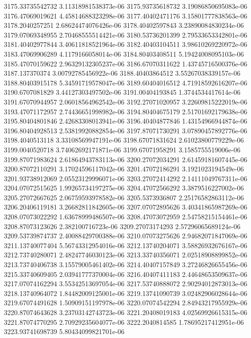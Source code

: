 {3175.33735542732 3.11318981538373e-06
3175.93735618732 3.19086850695083e-06
3176.47069019621 4.45814688323298e-06
3177.40402471176 3.15801777838563e-06
3178.2040257251 2.68624474076426e-06
3178.40402597843 3.23890084830234e-06
3179.07069348955 2.70468555514421e-06
3180.53736201399 2.79533653342801e-06
3181.40402977844 3.40611818521964e-06
3182.40403104511 3.98610269220972e-06
3183.47069906289 4.1179166058014e-06
3184.80403408511 5.19424008095103e-06
3185.47070159622 2.96329132305237e-06
3186.67070311622 1.43745716500376e-06
3187.137370374 3.00792785456922e-06
3188.40403864512 3.55267038339157e-06
3188.80403915178 5.34591719578047e-06
3189.60404016512 4.71918592616207e-06
3190.6707081829 3.44127303497502e-06
3191.00404193845 1.3744534417614e-06
3191.67070944957 2.06018564962542e-06
3192.27071020957 3.22609815222019e-06
3193.47071172957 2.74436651998982e-06
3194.80404675179 2.51701692179638e-06
3195.80404801846 2.42683308013941e-06
3196.40404877846 1.43154966944874e-06
3196.80404928513 2.53819920882854e-06
3197.87071730291 3.07890457892776e-06
3198.4040513118 3.33108569947191e-06
3198.67071831624 2.61023800779229e-06
3199.0040520718 3.74062692171871e-06
3199.67071958291 3.1585755519006e-06
3199.87071983624 2.61864943783113e-06
3200.27072034291 2.61459181607445e-06
3200.87072110291 3.17024596117042e-06
3201.47072186291 3.1921023194549e-06
3201.93738912069 2.05523129996071e-06
3203.27072414292 2.14111049767311e-06
3204.07072515625 1.99265734197275e-06
3204.47072566292 3.3879516227002e-06
3205.27072667625 2.06759593978582e-06
3205.5373936807 2.25176582863112e-06
3206.20406119181 3.26682811842605e-06
3207.07072895626 3.40341865987269e-06
3208.07073022292 1.63678999486507e-06
3208.47073072959 2.54758215154461e-06
3208.87073123626 2.382100716723e-06
3209.27073174293 2.57296065689124e-06
3209.53739874737 2.40088429700388e-06
3210.07073275626 2.94682071847069e-06
3211.13740077404 5.56743312954016e-06
3212.13740204071 3.58826932676167e-06
3212.73740280071 2.48247746030123e-06
3213.33740356071 2.02518908899852e-06
3213.73740406738 3.15579005461402e-06
3214.40407157849 3.27246826655456e-06
3215.33740609405 2.03941777370004e-06
3216.40407411183 2.44648653509637e-06
3217.07074162294 3.55342513697054e-06
3217.53740888072 2.90294012873013e-06
3218.13740964072 1.84482009125001e-06
3219.13741090739 3.02482906028644e-06
3219.67074491628 1.50909151197978e-06
3220.07074542294 2.84943217955929e-06
3220.87074643628 3.23703142743723e-06
3221.20408019183 4.02569926615315e-06
3221.87074770295 2.70929235604077e-06
3222.2040814585 1.78695217412951e-06
3223.93741698739 5.80434099821701e-06
}
